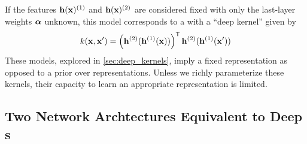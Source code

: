 If the features ${\bf{h}}({\bf{x}})^{(1)}$ and ${\bf{h}}({\bf{x}})^{(2)}$ are considered fixed with only the last-layer weights ${\boldsymbol{\alpha}}$ unknown, this model corresponds to a \gp{} with a ``deep kernel'' given by
\begin{align}
k({\bf{x}}, {\bf{x}}') = \left( {\bf{h}}^{(2)} ( {\bf{h}}^{(1)}({\bf{x}}) ) \right) ^{\mathsf{T}} {\bf{h}}^{(2)} ({\bf{h}}^{(1)}({\bf{x}}') )
\end{align}
These models, explored in \cref{sec:deep_kernels}, imply a fixed representation as opposed to a prior over representations.
Unless we richly parameterize these kernels, their capacity to learn an appropriate representation is limited. %


 
\subsection{Two Network Archtectures Equivalent to Deep \sgp{}s}

\def\halfshift{0.0cm}

